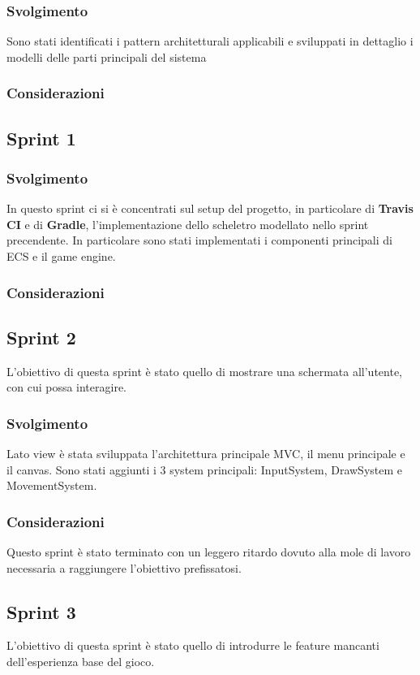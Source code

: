 \subsubsection{Svolgimento}
Sono stati identificati i pattern architetturali applicabili e sviluppati in dettaglio i modelli delle parti principali del sistema
\subsubsection{Considerazioni}

\subsection{Sprint 1}
\subsubsection{Svolgimento}
In questo sprint ci si è concentrati sul setup del progetto, in particolare di \textbf{Travis CI} e di \textbf{Gradle}, l'implementazione dello scheletro modellato nello sprint precendente.
In particolare sono stati implementati i componenti principali di ECS e il game engine.
\subsubsection{Considerazioni}
\subsection{Sprint 2}
L'obiettivo di questa sprint è stato quello di mostrare una schermata all'utente, con cui possa interagire.
\subsubsection{Svolgimento}
Lato view è stata sviluppata l'architettura principale MVC, il menu principale e il canvas.
Sono stati aggiunti i 3 system principali: InputSystem, DrawSystem e MovementSystem.
\subsubsection{Considerazioni}
Questo sprint è stato terminato con un leggero ritardo dovuto alla mole di lavoro necessaria a raggiungere l'obiettivo prefissatosi.
\subsection{Sprint 3}
L'obiettivo di questa sprint è stato quello di introdurre le feature mancanti dell'esperienza base del gioco.
